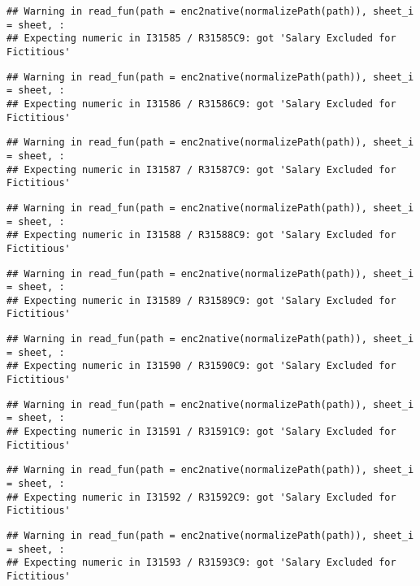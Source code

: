 \documentclass[
]{article}
\begin{document}
\begin{verbatim}
## Warning in read_fun(path = enc2native(normalizePath(path)), sheet_i = sheet, :
## Expecting numeric in I31585 / R31585C9: got 'Salary Excluded for Fictitious'
\end{verbatim}

\begin{verbatim}
## Warning in read_fun(path = enc2native(normalizePath(path)), sheet_i = sheet, :
## Expecting numeric in I31586 / R31586C9: got 'Salary Excluded for Fictitious'
\end{verbatim}

\begin{verbatim}
## Warning in read_fun(path = enc2native(normalizePath(path)), sheet_i = sheet, :
## Expecting numeric in I31587 / R31587C9: got 'Salary Excluded for Fictitious'
\end{verbatim}

\begin{verbatim}
## Warning in read_fun(path = enc2native(normalizePath(path)), sheet_i = sheet, :
## Expecting numeric in I31588 / R31588C9: got 'Salary Excluded for Fictitious'
\end{verbatim}

\begin{verbatim}
## Warning in read_fun(path = enc2native(normalizePath(path)), sheet_i = sheet, :
## Expecting numeric in I31589 / R31589C9: got 'Salary Excluded for Fictitious'
\end{verbatim}

\begin{verbatim}
## Warning in read_fun(path = enc2native(normalizePath(path)), sheet_i = sheet, :
## Expecting numeric in I31590 / R31590C9: got 'Salary Excluded for Fictitious'
\end{verbatim}

\begin{verbatim}
## Warning in read_fun(path = enc2native(normalizePath(path)), sheet_i = sheet, :
## Expecting numeric in I31591 / R31591C9: got 'Salary Excluded for Fictitious'
\end{verbatim}

\begin{verbatim}
## Warning in read_fun(path = enc2native(normalizePath(path)), sheet_i = sheet, :
## Expecting numeric in I31592 / R31592C9: got 'Salary Excluded for Fictitious'
\end{verbatim}

\begin{verbatim}
## Warning in read_fun(path = enc2native(normalizePath(path)), sheet_i = sheet, :
## Expecting numeric in I31593 / R31593C9: got 'Salary Excluded for Fictitious'
\end{verbatim}
\end{document}
